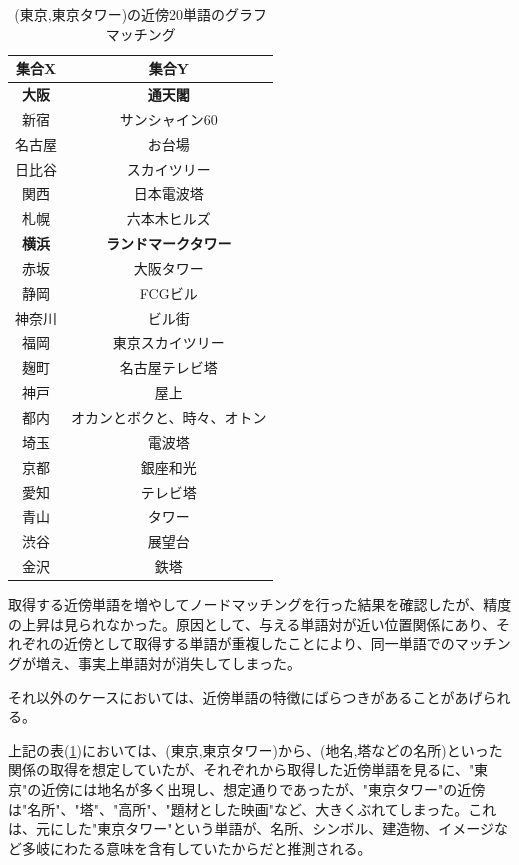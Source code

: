 \begin{table}[!h]
\begin{minipage}[t]{.45\textwidth}
    \caption[(東京,東京タワー)の近傍20単語のグラフマッチング]{(東京,東京タワー)の近傍20単語のグラフマッチング}
    \label{ttt}
    \begin{center}
      \begin{tabular}{|c||c|} \hline
        集合X & 集合Y \\ \hline \hline
        \textbf{大阪} & \textbf{通天閣} \\
        新宿 & サンシャイン60 \\
        名古屋 & お台場 \\
        日比谷 & スカイツリー \\
        関西 & 日本電波塔 \\
        札幌 & 六本木ヒルズ \\
        \textbf{横浜} & \textbf{ランドマークタワー} \\
        赤坂 & 大阪タワー \\
        静岡 & FCGビル \\
        神奈川 & ビル街 \\ \hline
        福岡 & 東京スカイツリー \\
        麹町 & 名古屋テレビ塔 \\
        神戸 & 屋上 \\
        都内 & オカンとボクと、時々、オトン \\
        埼玉 & 電波塔 \\
        京都 & 銀座和光 \\
        愛知 & テレビ塔 \\
        青山 & タワー \\
        渋谷 & 展望台 \\
        金沢 & 鉄塔 \\ \hline
      \end{tabular}
    \end{center}
  \end{minipage}
\end{table}

取得する近傍単語を増やしてノードマッチングを行った結果を確認したが、精度の上昇は見られなかった。原因として、与える単語対が近い位置関係にあり、それぞれの近傍として取得する単語が重複したことにより、同一単語でのマッチングが増え、事実上単語対が消失してしまった。

それ以外のケースにおいては、近傍単語の特徴にばらつきがあることがあげられる。

上記の表(\ref{ttt})においては、(東京,東京タワー)から、(地名,塔などの名所)といった関係の取得を想定していたが、それぞれから取得した近傍単語を見るに、"東京"の近傍には地名が多く出現し、想定通りであったが、"東京タワー"の近傍は"名所"、"塔"、"高所"、"題材とした映画"など、大きくぶれてしまった。これは、元にした"東京タワー"という単語が、名所、シンボル、建造物、イメージなど多岐にわたる意味を含有していたからだと推測される。

